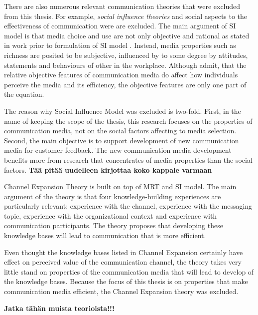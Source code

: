 \documentclass[english,12pt,a4paper,pdftex]{article}
\begin{document}
There are also numerous relevant communication theories that were excluded from this thesis. For example, \emph{social influence theories} and social aspects to the effectiveness of communication were are excluded. The main argument of \ac{SI} model is that media choice and use are not only objective and rational as stated in work prior to formulation of \ac{SI} model \citep{fulk1987}. Instead, media properties such as richness are posited to be subjective, influenced by to some degree by attitudes, statements and behaviours of other in the workplace. Although \citet{schmitz1991} admit, that the relative objective features of communication media do affect how individuals perceive the media and its efficiency, the objective features are only one part of the equation.

The reason why Social Influence Model was excluded is two-fold. First, in the name of keeping the scope of the thesis, this research focuses on the properties of communication media, not on the social factors affecting to media selection. Second, the main objective is to support development of new communication media for customer feedback. The new communication media development benefits more from research that concentrates of media properties than the social factors. \textbf{Tää pitää uudelleen kirjottaa koko kappale varmaan}

Channel Expansion Theory is built on top of \ac{MRT} and \ac{SI} model. The main argument of the theory is that four knowledge-building experiences are particularly relevant: experience with the channel, experience with the messaging topic, experience with the organizational context and experience with communication participants. The theory proposes that developing these knowledge bases will lead to communication that is more efficient. \citep{carlson1994} \citep{carlson1999}

Even thought the knowledge bases listed in Channel Expansion certainly have effect on perceived value of the communication channel, the theory takes very little stand on properties of the communication media that will lead to develop of the knowledge bases. Because the focus of this thesis is on properties that make communication media efficient, the Channel Expansion theory was excluded.

\textbf{Jatka tähän muista teorioista!!!}

\end{document}

